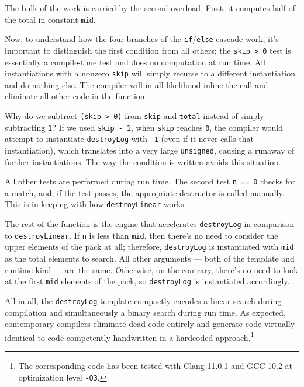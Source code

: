 The bulk of the work is carried by the second overload. First, it
computes half of the total in constant \lstinline!mid!.

Now, to understand how the four branches of the
\lstinline!if!/\lstinline!else! cascade work, it's important to distinguish
the first condition from all others; the
\lstinline!skip!~\lstinline!>!~\lstinline!0! test is essentially a compile-time
test and does no computation at run time. All instantiations with a
nonzero \lstinline!skip! will simply recurse to a different instantiation
and do nothing else. The compiler will in all likelihood inline the call
and eliminate all other code in the function.

Why do we subtract \lstinline!(skip!~\lstinline!>!~\lstinline!0)! from
\lstinline!skip! and \lstinline!total! instead of simply subtracting
\lstinline!1!? If we used \lstinline!skip!~\lstinline!-!~\lstinline!1!, when
\lstinline!skip! reaches \lstinline!0!, the compiler would attempt to
instantiate \lstinline!destroyLog! with \lstinline!-1! (even if it never calls
that instantiation), which translates into a very large
\lstinline!unsigned!, causing a runaway of further instantiations. The way
the condition is written avoids this situation.

All other tests are performed during run time. The second test
\lstinline!n!~\lstinline!==!~\lstinline!0! checks for a match, and, if the test
passes, the appropriate destructor is called manually. This is in
keeping with how \lstinline!destroyLinear! works.

The rest of the function is the engine that accelerates
\lstinline!destroyLog! in comparison to\linebreak%
 \lstinline!destroyLinear!. If
\lstinline!n! is less than \lstinline!mid!, then there's no need to consider
the upper elements of the pack at all; therefore, \lstinline!destroyLog! is
instantiated with \lstinline!mid! as the total elements to search. All
other arguments --- both of the template and runtime kind --- are the
same. Otherwise, on the contrary, there's no need to look at the first
\lstinline!mid! elements of the pack, so \lstinline!destroyLog! is
instantiated accordingly.

All in all, the \lstinline!destroyLog! template compactly encodes a linear
search during compilation and simultaneously a binary search during run
time. As expected, contemporary compilers eliminate dead code entirely
and generate code virtually identical to code competently handwritten in
a hardcoded approach.{\cprotect\footnote{The corresponding code has been
tested with Clang 11.0.1 and GCC 10.2 at optimization level
  \lstinline!-O3!.}}

